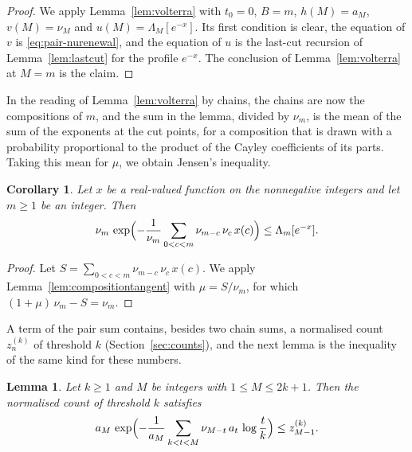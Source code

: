 \documentclass{amsart}
\newtheorem{lemma}[theorem]{Lemma}
\newtheorem{corollary}[theorem]{Corollary}
\theoremstyle{definition}
\theoremstyle{remark}
\numberwithin{equation}{section}
\begin{document}
\begin{proof}
We apply Lemma~\ref{lem:volterra} with $t_0=0$, $B=m$, $h(M)=a_M$,
$v(M)=\nu_M$ and $u(M)=\Lambda_M[e^{-x}]$. Its first condition is clear, the
equation of $v$ is \eqref{eq:pair-nurenewal}, and the equation of $u$ is the
last-cut recursion of Lemma~\ref{lem:lastcut} for the profile $e^{-x}$. The
conclusion of Lemma~\ref{lem:volterra} at $M=m$ is the claim.
\end{proof}

In the reading of Lemma~\ref{lem:volterra} by chains, the chains
are now the compositions of $m$, and
the sum in the lemma, divided by $\nu_m$, is the mean of the sum
of the exponents at the cut points, for a composition that is drawn with a
probability proportional to the product of the Cayley coefficients of its
parts. Taking this mean for $\mu$, we obtain Jensen's inequality.

\begin{corollary}\label{cor:compositionjensen}
Let $x$ be a real-valued function on the nonnegative integers and let
$m\ge1$ be an integer. Then
\[
\nu_m\,\exp\Bigl(-\frac{1}{\nu_m}\sum_{0<c<m}\nu_{m-c}\,\nu_c\,x(c)\Bigr)
\le\Lambda_m[e^{-x}].
\]
\end{corollary}

\begin{proof}
Let $S=\sum_{0<c<m}\nu_{m-c}\,\nu_c\,x(c)$. We apply
Lemma~\ref{lem:compositiontangent} with $\mu=S/\nu_m$, for which
$(1+\mu)\,\nu_m-S=\nu_m$.
\end{proof}

A term of the pair sum contains, besides two chain sums, a normalised count
$z^{(k)}_n$ of threshold $k$ (Section~\ref{sec:counts}), and the next
lemma is the inequality of the same kind for these numbers.

\begin{lemma}\label{lem:countjensen}
Let $k\ge1$ and $M$ be integers with $1\le M\le2k+1$. Then the normalised
count of threshold $k$ satisfies
\[
a_M\,\exp\Bigl(-\frac{1}{a_M}\sum_{k<t<M}\nu_{M-t}\,a_t\,\log\frac tk\Bigr)
\le z^{(k)}_{M-1}.
\]
\end{lemma}
\end{document}
